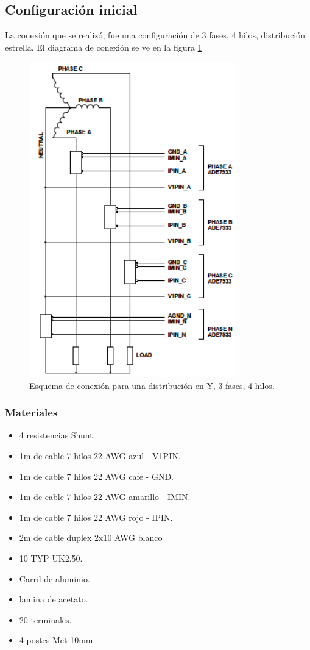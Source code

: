 \subsection{Configuración inicial}

La conexión que se realizó, fue una configuración de 3 fases, 4 hilos, distribución estrella. El diagrama de conexión se ve en la figura \ref{fig:configuracion}

\begin{figure}[H]
    \begin{center}
    \includegraphics[width = 9cm]{3Proyecto/configuration}
    \caption{ Esquema de conexión para una distribución en Y, 3 fases, 4 hilos.} 
    \label{fig:configuracion}
    \end{center}
    \end{figure}

\subsubsection{Materiales}
\begin{itemize}
\itemsep0em
\item 4 resistencias Shunt.
\item 1m de cable 7 hilos 22 AWG azul - V1PIN.
\item 1m de cable 7 hilos 22 AWG cafe - GND.
\item 1m de cable 7 hilos 22 AWG amarillo - IMIN.
\item 1m de cable 7 hilos 22 AWG rojo - IPIN.
\item 2m de cable duplex 2x10 AWG blanco
\item 10 TYP UK2.50.
\item Carril de aluminio.
\item lamina de acetato.
\item 20 terminales.
\item 4 postes Met 10mm.
  
\end{itemize}

